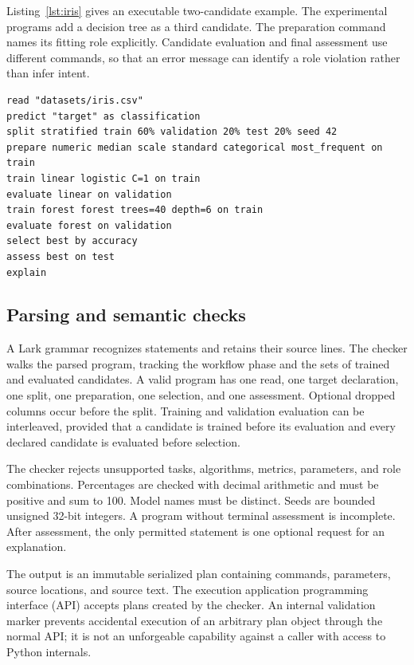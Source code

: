 \documentclass[lettersize,journal]{IEEEtran}
\begin{document}
Listing~\ref{lst:iris} gives an executable two-candidate example. The experimental programs add a decision tree as a third candidate. The preparation command names its fitting role explicitly. Candidate evaluation and final assessment use different commands, so that an error message can identify a role violation rather than infer intent.

\begin{lstlisting}[caption={A complete classification workflow.},label={lst:iris},float=t]
read "datasets/iris.csv"
predict "target" as classification
split stratified train 60% validation 20% test 20% seed 42
prepare numeric median scale standard categorical most_frequent on train
train linear logistic C=1 on train
evaluate linear on validation
train forest forest trees=40 depth=6 on train
evaluate forest on validation
select best by accuracy
assess best on test
explain
\end{lstlisting}

\subsection{Parsing and semantic checks}
A Lark grammar recognizes statements and retains their source lines. The checker walks the parsed program, tracking the workflow phase and the sets of trained and evaluated candidates. A valid program has one read, one target declaration, one split, one preparation, one selection, and one assessment. Optional dropped columns occur before the split. Training and validation evaluation can be interleaved, provided that a candidate is trained before its evaluation and every declared candidate is evaluated before selection.

The checker rejects unsupported tasks, algorithms, metrics, parameters, and role combinations. Percentages are checked with decimal arithmetic and must be positive and sum to 100. Model names must be distinct. Seeds are bounded unsigned 32-bit integers. A program without terminal assessment is incomplete. After assessment, the only permitted statement is one optional request for an explanation.

The output is an immutable serialized plan containing commands, parameters, source locations, and source text. The execution application programming interface (API) accepts plans created by the checker. An internal validation marker prevents accidental execution of an arbitrary plan object through the normal API; it is not an unforgeable capability against a caller with access to Python internals.
\end{document}
